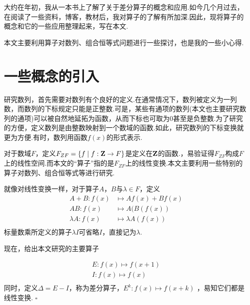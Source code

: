 \documentclass[10pt]{article}
\newcommand*{\QEDB}{\hfill\ensuremath{\square}}  %
\newcommand*{\D}{\text{，}}
\newcommand*{\bZ}{{\bf Z}}
\numberwithin{equation}{section}
\begin{document}
\pagestyle{main}    %
\thispagestyle{empty}


\par 大约在年初，我从一本书上了解了关于差分算子的概念和应用.如今几个月过去，在阅读了一些资料，博客，教材后，我对算子的了解有所加深.因此，现将算子的概念和它的一些应用整理起来，写在本文.
\par 本文主要利用算子对数列、组合恒等式问题进行一些探讨，也是我的一些小心得.

\section{一些概念的引入}
\par 研究数列，首先需要对数列有个良好的定义.在通常情况下，数列被定义为一列数，而数列的下标规定只能是正整数.可是，某些有通项的数列({\zhfs 本文也主要研究数列的通项})可以被自然地延拓为函数，从而下标也可取为$0$甚至是负整数.为了研究的方便，定义数列是由整数映射到一个数域的函数.如此，研究数列的下标变换就更为方便.有时，数列用函数$f(x)$的形式表示.
\par 对于数域$F$，定义$F_{ZF} = \{f \mid f:\bZ \rightarrow F\}$是定义在$\bZ$的函数.，易验证得$F_{ZF}$构成$F$上的线性空间.而本文的“{\zhht 算子}”指的是$F_{ZF}$上的线性变换.本文主要利用一些特别的算子对数列、组合恒等式等进行研究.
\par 就像对线性变换一样，对于算子$A\D B$与$\lambda \in F$，定义
\[
\begin{split}
A+B: f(x) &\mapsto Af(x)+Bf(x) \\
AB: f(x) &\mapsto A(B(f(x)) \\
\lambda A: f(x) &\mapsto \lambda A(f(x)) \\
\end{split}
\]
标量数乘所定义的算子$\lambda I$可省略$I$，直接记为$\lambda$.
\par 现在，给出本文研究的主要算子
\begin{DY}
    \[\begin{split}
            E: f(x) \mapsto f(x+1)\\
            I: f(x) \mapsto f(x) \\
    \end{split}\]
    \indent 同时，定义$\Delta = E - I$，称为{\zhht 差分算子}，$E^{k}: f(x) \mapsto f(x+k)$ ，易知它们都是线性变换. \QEDB
\end{DY}
\end{document}
